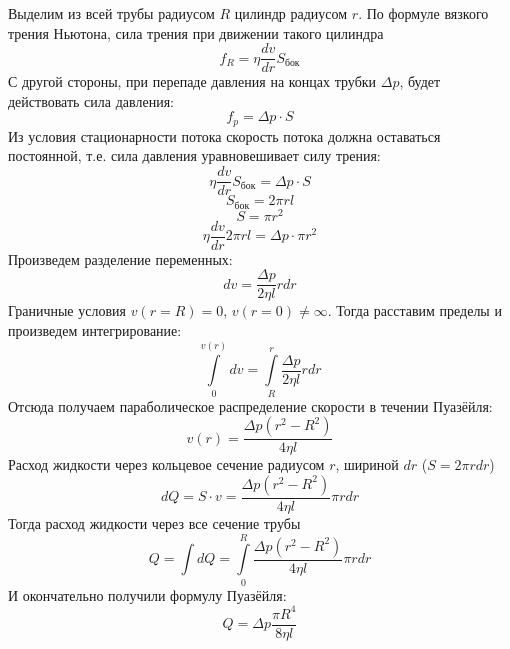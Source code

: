 \documentclass[a4paper,12pt]{article}%
\begin{document}
Выделим из всей трубы радиусом $R$ цилиндр радиусом $r$. По формуле вязкого трения Ньютона, сила трения при движении такого цилиндра 
\begin{equation}
	f_R=\eta\frac{dv}{dr}S_\text{бок}
\end{equation}
С другой стороны, при перепаде давления на концах трубки $\Delta p$, будет действовать сила давления:
\begin{equation}
	f_p=\Delta p \cdot S
\end{equation}
Из условия стационарности потока скорость потока должна оставаться постоянной, т.е. сила давления уравновешивает силу трения:
\begin{equation}
	\eta\frac{dv}{dr}S_\text{бок}=\Delta p \cdot S
\end{equation}
\begin{equation}
	S_\text{бок}=2\pi r l
\end{equation}
\begin{equation}
	S=\pi r^2
\end{equation}
\begin{equation}
	\eta\frac{dv}{dr}2\pi r l=\Delta p \cdot \pi r^2
\end{equation}
Произведем разделение переменных:
\begin{equation}
	dv=\frac{\Delta p}{2\eta l}rdr
\end{equation}
Граничные условия $v(r=R)=0$, $v(r=0)\ne\infty$. Тогда расставим пределы и произведем интегрирование:
\begin{equation}
	\int\limits_0^{v(r)}dv=\int\limits_R^r\frac{\Delta p}{2\eta l}rdr
\end{equation}
Отсюда получаем параболическое распределение скорости в течении Пуазёйля: 
\begin{equation}
	v(r)=\frac{\Delta p (r^2-R^2)}{4\eta l}
\end{equation}
Расход жидкости через кольцевое сечение радиусом $r$, шириной $dr$ ($S=2\pi r dr$)
\begin{equation}
	dQ=S\cdot v=\frac{\Delta p (r^2-R^2)}{4\eta l}\pi r dr
\end{equation}
Тогда расход жидкости через все сечение трубы
\begin{equation}
	Q=\int dQ=\int\limits_0^R \frac{\Delta p (r^2-R^2)}{4\eta l}\pi r dr
\end{equation}
И окончательно получили формулу Пуазёйля:
\begin{equation}
	\label{Q}
	Q=\Delta p \frac{\pi R^4}{8\eta l}
\end{equation}
\end{document}

